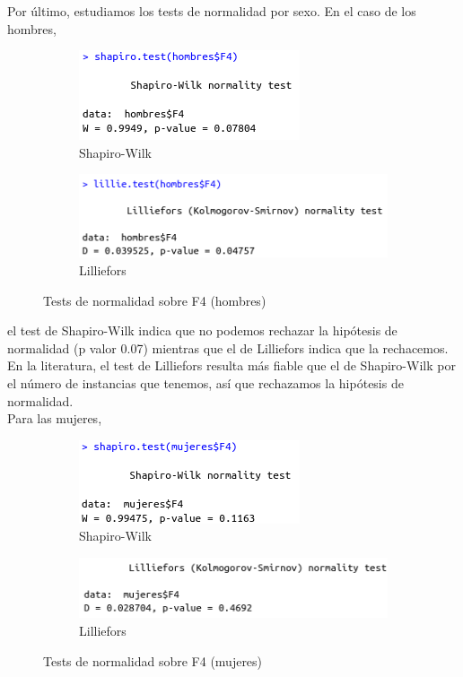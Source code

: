 Por último, estudiamos los tests de normalidad por sexo. En el caso de los hombres, 

\begin{figure}[H]
	\centering
	\begin{subfigure}{.5\textwidth}
		\centering
		\includegraphics[width=.6\linewidth]{swh-F4.png}
		\caption{Shapiro-Wilk}
		\label{fig:swh-F4}
	\end{subfigure}%
	\begin{subfigure}{.5\textwidth}
		\centering
		\includegraphics[width=.6\linewidth]{lh-F4.png}
		\caption{Lilliefors}
		\label{fig:lh-F4}
	\end{subfigure}
	\caption{Tests de normalidad sobre F4 (hombres)}
	\label{fig:normhF4}
\end{figure}

el test de Shapiro-Wilk indica que no podemos rechazar la hipótesis de normalidad (p valor 0.07) mientras que el de Lilliefors indica que la rechacemos. En la literatura, el test de Lilliefors resulta más fiable que el de Shapiro-Wilk por el número de instancias que tenemos, así que rechazamos la hipótesis de normalidad. \\

Para las mujeres,

\begin{figure}[H]
	\centering
	\begin{subfigure}{.5\textwidth}
		\centering
		\includegraphics[width=.6\linewidth]{swm-F4.png}
		\caption{Shapiro-Wilk}
		\label{fig:swm-F4}
	\end{subfigure}%
	\begin{subfigure}{.5\textwidth}
		\centering
		\includegraphics[width=.6\linewidth]{lm-F4.png}
		\caption{Lilliefors}
		\label{fig:lm-F4}
	\end{subfigure}
	\caption{Tests de normalidad sobre F4 (mujeres)}
	\label{fig:normmF4}
\end{figure}

